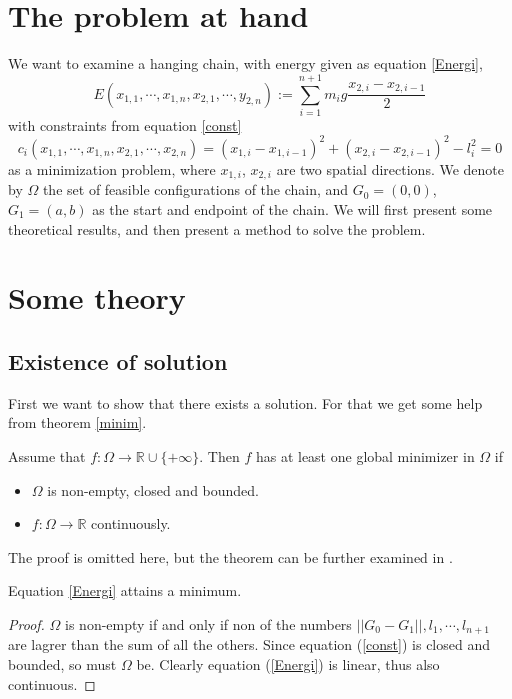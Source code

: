 \section{The problem at hand}
We want to examine a hanging chain, with energy given as equation \eqref{Energi},
\begin{equation} \label{Energi}
E(x_{1,1},\cdots, x_{1,n},x_{2,1},\cdots,y_{2,n}):= \sum \limits^{n+1}_{i=1} m_i g \frac{x_{2,i}-x_{2,i-1}}{2}
\end{equation}
with constraints from equation \eqref{const}
\begin{equation} \label{const}
c_i(x_{1,1},\cdots, x_{1,n},x_{2,1},\cdots,x_{2,n}) = (x_{1,i}-x_{1,i-1})^2 + (x_{2,i}-x_{2,i-1})^2 - l^2_i = 0
\end{equation}
as a minimization problem, where $x_{1,i} $, $x_{2,i} $ are two spatial directions. We denote by $\Omega$ the set of feasible configurations of the chain, and $G_0 = (0,0)$, $G_1= (a,b)$ as the start and endpoint of the chain. We will first present some theoretical results, and then present a method to solve the problem.

\section{Some theory}
\subsection{Existence of solution}
First we want to show that there exists a solution. For that we get some help from theorem \ref{minim}.
\begin{theorem} \label{minim}
Assume that $f: \Omega \rightarrow \mathbb{R} \cup \{+\infty\}$. Then $f$ has at least one global minimizer in $\Omega$ if
\begin{itemize}
\item $\Omega$ is non-empty, closed and bounded.
\item $f: \Omega \rightarrow \mathbb{R}$ continuously.
\end{itemize}
\end{theorem}
The proof is omitted here, but the theorem can be further examined in \cite{thm1}.

\begin{proposition}
Equation \eqref{Energi} attains a minimum.
\end{proposition}
\begin{proof}
$\Omega$ is non-empty if and only if non of the numbers $||G_0-G_1||, l_1,\cdots,l_{n+1} $ are lagrer than the sum of all the others. Since equation (\ref{const}) is closed and bounded, so must $\Omega$ be. Clearly equation (\ref{Energi}) is linear, thus also continuous. 
\end{proof}

